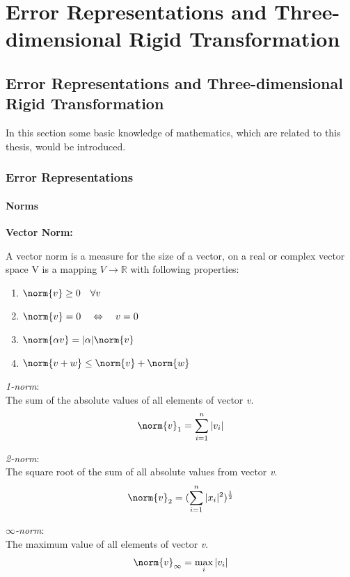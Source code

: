 \chapter{Error Representations and Three-dimensional Rigid Transformation}
\label{chap:Error Representations and Three-dimensional Rigid Transformation}

\section{Error Representations and Three-dimensional Rigid Transformation}
In this section some basic knowledge of mathematics, which are related to this thesis, would be introduced.

\subsection{Error Representations}

\subsubsection{Norms}
\textbf{Vector Norm:}

A vector norm is a measure for the size of a vector, on a real or complex vector space V is a mapping $V \to \mathbb{R} $ with following properties:

\begin{enumerate}
\item $ \norm{v} \geq 0 \quad \forall v $
\item $ \norm{v} = 0 \quad \Leftrightarrow  \quad v = 0$
\item $ \norm{\alpha v} = |\alpha| \norm{v} $
\item $ \norm{v+w} \leq  \norm{v} + \norm{w}$
\end{enumerate}

\textit{1-norm}:\\
The sum of the absolute values of all elements of vector \textit{v}.
\begin{equation*}  
\norm{v}_1 = \sum_{i=1}^{n} |v_{i}|   
\end{equation*}

\textit{2-norm}:\\
The square root of the sum of all absolute values from vector \textit{v}.
\begin{equation*}  
\norm{v}_2 = (\sum_{i=1}^{n} |x_{i}|^2)^{\frac{1}{2}}     
\end{equation*}

\textit{$\infty$-norm}:\\
The maximum value of all elements of vector \textit{v}.
\begin{equation*}  
\norm{v}_{\infty} =
 \operatorname*{max}_i |v_i|    
\end{equation*}


